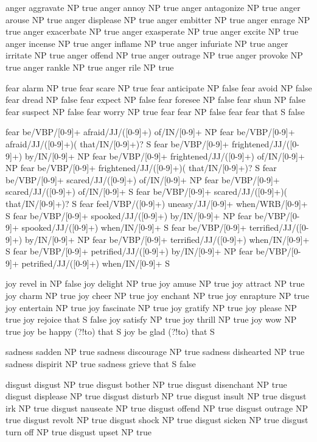 anger	aggravate	NP	true
anger	annoy	NP	true
anger	antagonize	NP	true
anger	arouse	NP	true
anger	displease	NP	true
anger	embitter	NP	true
anger	enrage	NP	true
anger	exacerbate	NP	true
anger	exasperate	NP	true
anger	excite	NP	true
anger	incense	NP	true
anger	inflame	NP	true
anger	infuriate	NP	true
anger	irritate		NP	true
anger	offend	NP	true
anger	outrage	NP	true
anger	provoke	NP	true
anger	rankle	NP	true
anger	rile	NP	true

fear	alarm	NP	true
fear	scare	NP	true
fear	anticipate	NP	false
fear	avoid	NP	false
fear	dread	NP	false
fear	expect	NP	false
fear	foresee	NP	false
fear	shun	NP	false
fear	suspect	NP	false
fear	worry	NP	true
fear	fear	NP	false
fear	fear that	S	false


fear	be/VBP/[0-9]+ afraid/JJ/([0-9]+) of/IN/[0-9]+	NP
fear	be/VBP/[0-9]+ afraid/JJ/([0-9]+)( that/IN/[0-9]+)?	S
fear	be/VBP/[0-9]+ frightened/JJ/([0-9]+) by/IN/[0-9]+	NP
fear	be/VBP/[0-9]+ frightened/JJ/([0-9]+) of/IN/[0-9]+	NP
fear	be/VBP/[0-9]+ frightened/JJ/([0-9]+)( that/IN/[0-9]+)?	S
fear	be/VBP/[0-9]+ scared/JJ/([0-9]+) of/IN/[0-9]+	NP
fear	be/VBP/[0-9]+ scared/JJ/([0-9]+) of/IN/[0-9]+	S
fear	be/VBP/[0-9]+ scared/JJ/([0-9]+)( that/IN/[0-9]+)?	S
fear	feel/VBP/([0-9]+) uneasy/JJ/[0-9]+ when/WRB/[0-9]+	S
fear	be/VBP/[0-9]+ spooked/JJ/([0-9]+) by/IN/[0-9]+	NP
fear	be/VBP/[0-9]+ spooked/JJ/([0-9]+) when/IN/[0-9]+	S
fear	be/VBP/[0-9]+ terrified/JJ/([0-9]+) by/IN/[0-9]+	NP
fear	be/VBP/[0-9]+ terrified/JJ/([0-9]+) when/IN/[0-9]+	S
fear	be/VBP/[0-9]+ petrified/JJ/([0-9]+) by/IN/[0-9]+	NP
fear	be/VBP/[0-9]+ petrified/JJ/([0-9]+) when/IN/[0-9]+	S


joy	revel in	NP	false
joy	delight	NP	true
joy	amuse	NP	true
joy	attract	NP	true
joy	charm	NP	true
joy	cheer	NP	true
joy	enchant	NP	true
joy	enrapture	NP	true
joy	entertain	NP	true
joy	fascinate	NP	true
joy	gratify	NP	true
joy	please	NP	true
joy	rejoice	that	S	false
joy	satisfy	NP	true
joy	thrill	NP	true
joy	wow	NP	true
joy	be happy (?!to) that	S
joy	be glad (?!to) that	S

sadness	sadden	NP	true
sadness	discourage	NP	true
sadness	dishearted	NP	true
sadness	dispirit	NP	true
sadness	grieve that S	false

disgust	disgust	NP	true
disgust	bother	NP	true
disgust	disenchant	NP	true
disgust	displease	NP	true
disgust	disturb	NP	true
disgust	insult	NP	true
disgust	irk	NP	true
disgust	nauseate	NP	true
disgust	offend	NP	true
disgust	outrage	NP	true
disgust	revolt	NP	true
disgust	shock	NP	true
disgust	sicken	NP	true
disgust	turn off	NP	true
disgust	upset	NP	true

